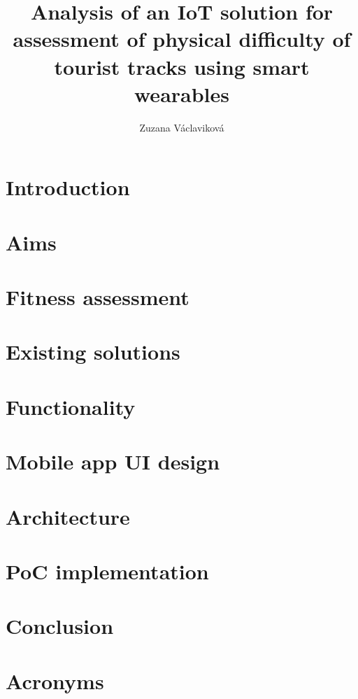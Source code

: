 \documentclass[thesis=B,english]{FITthesis}[2019/03/21]
\title{Analysis of an IoT solution for assessment of physical difficulty of tourist tracks using smart wearables}
\author{Zuzana Václaviková} %
\begin{document}



\chapter{Introduction}


\chapter{Aims}

\chapter{Fitness assessment}

\chapter{Existing solutions}

\chapter{Functionality}

\chapter{Mobile app UI design}

\chapter{Architecture}

\chapter{PoC implementation}


\chapter{Conclusion}





\appendix

\chapter{Acronyms}

\end{document}
